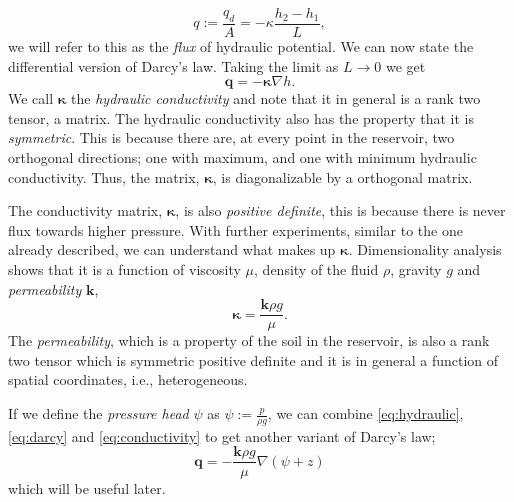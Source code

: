 \documentclass[../Main/main.tex]{subfiles}
\begin{document}
\begin{equation*}
q := \frac{q_d}{A} = -\kappa \frac{h_2-h_1}{L},
\end{equation*}
we will refer to this as the \emph{flux} of hydraulic potential. We can now state the differential version of Darcy's law. Taking the limit as $L\rightarrow 0$ we get 
\begin{equation}\label{eq:darcy}
\bm{q} = -\bm{\kappa} \nabla h.
\end{equation}
We call $\bm{\kappa}$ the \emph{hydraulic conductivity} and note that it in general is a rank two tensor, a matrix. The hydraulic conductivity also has the property that it is \emph{symmetric}. This is because there are, at every point in the reservoir, two orthogonal directions; one with maximum, and one with minimum hydraulic conductivity. Thus, the matrix, $\bm{\kappa}$, is diagonalizable by a orthogonal matrix.\par
The conductivity matrix, $\bm{\kappa}$, is also \emph{positive definite}, this is because there is never flux towards higher pressure. 
With further experiments, similar to the one already described, we can understand what makes up $\bm{\kappa}$. Dimensionality analysis shows that it is  a function of viscosity $\mu$, density of the fluid $\rho$, gravity $g$ and \emph{permeability} $\bm{k}$,
\begin{equation} \label{eq:conductivity}
\bm{\kappa} = \frac{\bm{k} \rho g}{\mu}.
\end{equation}
The \emph{permeability}, which is a property of the soil in the reservoir, is also a rank two tensor which is symmetric positive definite and it is in general a function of spatial coordinates, i.e., heterogeneous.
\par If we define the \emph{pressure head} $\psi$ as $\psi := \frac{p}{\rho g}$, we can combine \eqref{eq:hydraulic}, \eqref{eq:darcy} and \eqref{eq:conductivity} to get another variant of Darcy's law;
\begin{equation}\label{eq:darcyv2}
\bm{q} = -\frac{\bm{k}\rho g}{\mu}\nabla(\psi + z)
\end{equation}
 which will be useful later.
\end{document}
